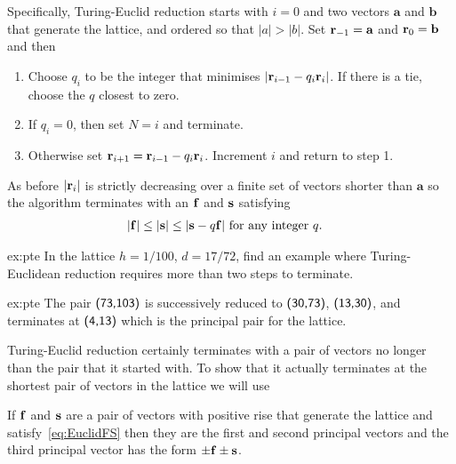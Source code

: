 Specifically, Turing-Euclid reduction starts with 
$i=0$ and two vectors $\mathbf{a}$ and $\mathbf{b}$ that generate the lattice, and ordered so that
$|a|>|b|$. Set $\mathbf{r}_{-1}=\mathbf{a}$ and $\mathbf{r}_{0}=\mathbf{b}$ and then
\begin{enumerate}
	\item Choose $q_i$ to be the integer that minimises  $|\mathbf{r}_{i-1}-q_i\mathbf{r}_{i}|$. If there is a tie, choose the $q$ closest to zero. 
	\item If $q_i=0$, then set $N=i$ and terminate.	
	\item Otherwise set  $\mathbf{r}_{i+1}=\mathbf{r}_{i-1}-q_i\mathbf{r}_{i}$. Increment $i$ and return to step 1.
\end{enumerate}
As before $|\mathbf{r}_{i}|$ is strictly decreasing over a finite set of vectors shorter than $\mathbf{a}$ so the algorithm terminates with an $\mathbf{f}$ and $\mathbf{s}$ satisfying 
\begin{align}
	\label{eq:EuclidFS}
	|\mathbf{f}|&\leq|\mathbf{s}| \leq |\mathbf{s}-q\mathbf{f}| \mbox{ for any integer $q$}.
\end{align}

\begin{jExercise}{ex:pte}
	In the lattice $h=1/100$, $d=17/72$, find an example where Turing-Euclidean reduction  requires more than two steps to terminate.
\end{jExercise}
\begin{jAnswer}{ex:pte}
	The pair $\textsf{(73,103)}$ is successively reduced to $\textsf{(30,73)}$, $\textsf{(13,30)}$, and terminates at $\textsf{(4,13)}$ which  is the principal pair for the lattice. 
\end{jAnswer}

Turing-Euclid reduction certainly terminates with a pair of vectors no longer than the pair that it started with. To show that it actually terminates at the shortest pair of vectors in the lattice we will use
\begin{theorem}
	If $\mathbf{f}$ and $\mathbf{s}$ are a pair of vectors with positive rise that generate the lattice and satisfy~\eqref{eq:EuclidFS} then they are the first and second principal vectors and the third principal vector has the form $\pm\mathbf{f}\pm\mathbf{s}$. 
	\label{thm:third}
\end{theorem}

